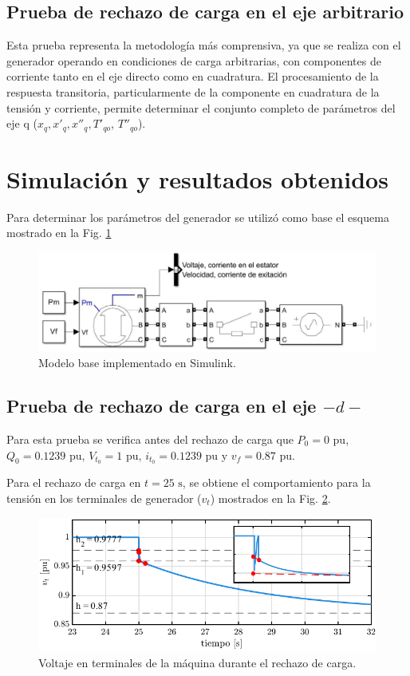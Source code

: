 \documentclass[conference]{IEEEtran}
\begin{document}
\subsection{Prueba de rechazo de carga en el eje arbitrario}

Esta prueba representa la metodología más comprensiva, ya que se realiza con el generador operando en condiciones de carga arbitrarias, con componentes de corriente tanto en el eje directo como en cuadratura. El procesamiento de la respuesta transitoria, particularmente de la componente en cuadratura de la tensión y corriente, permite determinar el conjunto completo de parámetros del eje q ($x_q, x'_q, x''_q, T'_{qo}$, $T''_{qo}$).

\section{Simulación y resultados obtenidos}
Para determinar los parámetros del generador se utilizó como base el esquema mostrado en la Fig. \ref{fig:Modelo_Simulink}

\begin{figure}[H]
    \centering
    \includegraphics[width=\linewidth]{Fig/Modelo_Simulink.pdf}
    \caption{Modelo base implementado en Simulink.}
    \label{fig:Modelo_Simulink}
\end{figure}

\subsection{Prueba de rechazo de carga en el eje $-d-$}

Para esta prueba se verifica antes del rechazo de carga que $P_0=0\text{ pu}$, $Q_0=0.1239\text{ pu}$,
$V_{t_0}=1\text{ pu}$, $i_{t_0}=0.1239\text{ pu}$ y $v_f=0.87\text{ pu}$.

Para el rechazo de carga en $t=25\text{ s}$, se obtiene el comportamiento para la tensión
en los terminales de generador ($v_t$) mostrados en la Fig. \ref{fig:fig1}.

\begin{figure}[H]
    \centering
    \includegraphics[width=\linewidth]{Fig/fig1.pdf}
    \caption{Voltaje en terminales de la máquina durante el rechazo de carga.}
    \label{fig:fig1}
\end{figure}
\end{document}
